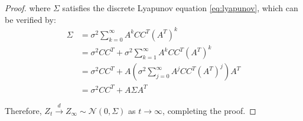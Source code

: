 \documentclass[10pt,a4paper]{amsart}
\begin{document}
\begin{proof}
where $\Sigma$ satisfies the discrete Lyapunov equation \eqref{eq:lyapunov}, which can be verified by:
\begin{align}
\Sigma &= \sigma^2 \sum_{k=0}^{\infty} A^k CC^T (A^T)^k\\
&= \sigma^2 CC^T + \sigma^2 \sum_{k=1}^{\infty} A^k CC^T (A^T)^k\\
&= \sigma^2 CC^T + A \left(\sigma^2 \sum_{j=0}^{\infty} A^j CC^T (A^T)^j\right) A^T\\
&= \sigma^2 CC^T + A\Sigma A^T
\end{align}

Therefore, $Z_t \xrightarrow{d} Z_\infty \sim \mathcal{N}(0, \Sigma)$ as $t \to \infty$, completing the proof.
\end{proof}
\end{document}
